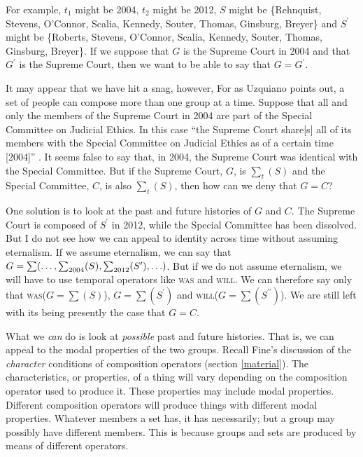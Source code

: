 \documentclass[11pt]{article}
\begin{document}
\begin{spacing}{1.5}
For example, $t_1$ might be 2004, $t_2$ might be 2012, $S$ might be
\{Rehnquist, Stevens, O'Connor, Scalia, Kennedy, Souter, Thomas,
Ginsburg, Breyer\} and $S^{\prime}$ might be \{Roberts, Stevens,
O'Connor, Scalia, Kennedy, Souter, Thomas, Ginsburg, Breyer\}.  If we
suppose that $G$ is the Supreme Court in 2004 and that $G^{\prime}$
is the Supreme Court, then we want to be able to say that $G =
G^{\prime}$.  

It may appear that we have hit a snag, however, For as Uzquiano points
out, a set of people can compose more than one group at a time.
Suppose that all and only the members of the Supreme Court in 2004 are
part of the Special Committee on Judicial Ethics.  In this case ``the
Supreme Court share[s] all of its members with the Special Committee
on Judicial Ethics as of a certain time [2004]''
\citep[151]{uzquiano2004a}.  It seems false to say that, in 2004, the
Supreme Court was identical with the Special Committee.  But if the
Supreme Court, $G$, is $\sum _{t} ( S )$ and the Special Committee,
$C$, is also $\sum _{t} ( S )$, then how can we deny that $G = C$?


One solution is to look at the past and future histories of $G$ and
$C$.  The Supreme Court is composed of $S^{\prime}$ in 2012, while the
Special Committee has been dissolved.  But I do not see how we can
appeal to identity across time without assuming eternalism.  If we
assume eternalism, we can say that $G = \sum ( \mathellipsis , \sum
_{2004}(S), \sum _{2012}(S^{\prime}), \mathellipsis )$.  But if we do
not assume eternalism, we will have to use temporal operators like
\textsc{was} and \textsc{will}.  We can therefore say only that
\textsc{was}($G = \sum (S)$), $G = \sum (S^{\prime})$ and
\textsc{will}($G = \sum (S^{\prime \prime})$).  We are still left with
its being presently the case that $G = C$.

What we {\em can} do is look at {\em possible} past and future
histories.  That is, we can appeal to the modal properties of the two
groups.  Recall Fine's discussion of the {\em character} conditions of
composition operators (section \ref{material}).  The characteristics,
or properties, of a thing will vary depending on the composition
operator used to produce it.  These properties may include modal
properties.  Different composition operators will produce things with
different modal properties.  Whatever members a set has, it has
necessarily; but a group may possibly have different members.  This is
because groups and sets are produced by means of different operators.


\end{spacing}
\end{document}
